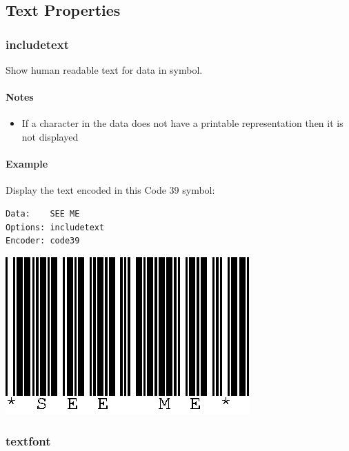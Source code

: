 \hypertarget{text-properties}{%
\subsection{Text Properties}\label{text-properties}}

\hypertarget{includetext}{%
\subsubsection{includetext}\label{includetext}}

Show human readable text for data in symbol.

\hypertarget{notes-3}{%
\paragraph{Notes}\label{notes-3}}

\begin{itemize}
\tightlist
\item
  If a character in the data does not have a printable representation
  then it is not displayed
\end{itemize}

\hypertarget{example-32}{%
\paragraph{Example}\label{example-32}}

Display the text encoded in this Code 39 symbol:

\begin{verbatim}
Data:    SEE ME
Options: includetext
Encoder: code39
\end{verbatim}

\includegraphics{images/optincludetext.eps}

\hypertarget{textfont}{%
\subsubsection{textfont}\label{textfont}}

